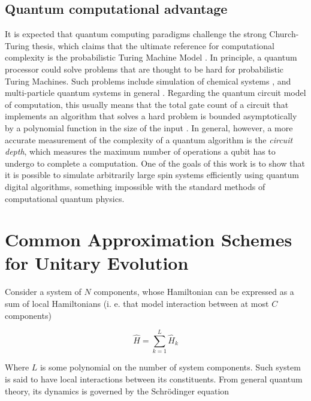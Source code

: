     

  \subsection{Quantum computational advantage}
    
    It is expected that quantum computing paradigms challenge the strong Church-Turing thesis, which claims that the ultimate reference for computational complexity is the probabilistic Turing Machine Model \cite{Nielsen, Strini}. In principle, a quantum processor could solve problems that are thought to be hard for probabilistic Turing Machines. Such problems include simulation of chemical systems \cite{QuantumChem1, QuantumChem2}, and multi-particle quantum systems in general \cite{Nielsen, LloydFermSim, BerryErrorBounds}. Regarding the quantum circuit model of computation, this usually means that the total gate count of a circuit that implements an algorithm that solves a hard problem is bounded asymptotically by a polynomial function in the size of the input \cite{Nielsen, Strini}. In general, however, a more accurate measurement of the complexity of a quantum algorithm is the \textit{circuit depth}, which measures the maximum number of operations a qubit has to undergo to complete a computation. One of the goals of this work is to show that it is possible to simulate arbitrarily large spin systems efficiently using quantum digital algorithms, something impossible with the standard methods of computational quantum physics.

\section{Common Approximation Schemes for Unitary Evolution}
\label{sec:trotter}

  Consider a system of $N$ components, whose Hamiltonian can be expressed as a sum of local Hamiltonians (i. e. that model interaction between at most $C$ components) \cite{Nielsen,LloydNature}

  \begin{equation}
    \hat{H} = \sum_{k = 1}^{L} \hat{H}_k
    \label{eq:SparseHam}
  \end{equation}

  Where $L$ is some polynomial on the number of system components. Such system is said to have local interactions between its constituents. From general quantum theory, its dynamics is governed by the Schrödinger equation
  
